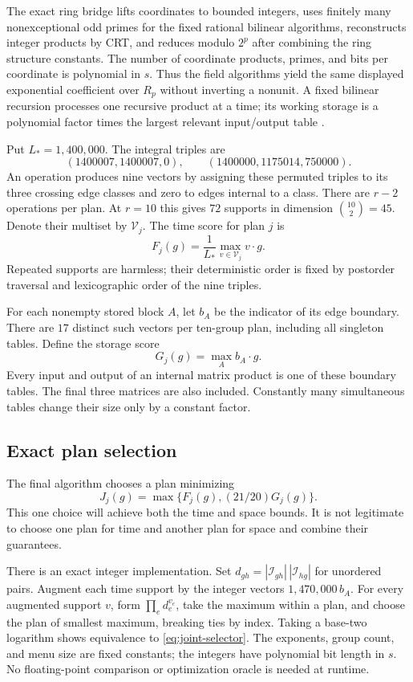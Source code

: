 The exact ring bridge lifts coordinates to bounded integers, uses finitely
many nonexceptional odd primes for the fixed rational bilinear algorithms,
reconstructs integer products by CRT, and reduces modulo $2^p$ after
combining the ring structure constants. The number of coordinate products,
primes, and bits per coordinate is polynomial in $s$. Thus the field
algorithms yield the same displayed exponential coefficient over $R_p$
without inverting a nonunit. A fixed bilinear recursion processes one
recursive product at a time; its working storage is a polynomial factor
times the largest relevant input/output table \cite{rectangular}.

Put $L_*=1{,}400{,}000$. The integral triples are
\begin{equation}\label{eq:triples}
 (1400007,1400007,0),\qquad(1400000,1175014,750000).
\end{equation}
An operation produces nine vectors by assigning these permuted triples to
its three crossing edge classes and zero to edges internal to a class.
There are $r-2$ operations per plan. At $r=10$ this gives $72$ supports
in dimension $\binom{10}2=45$. Denote their multiset by $\mathcal V_j$.
The time score for plan $j$ is
\[
 F_j(g)=\frac1{L_*}\max_{v\in\mathcal V_j}v\cdot g.
\]
Repeated supports are harmless; their deterministic order is fixed by
postorder traversal and lexicographic order of the nine triples.

For each nonempty stored block $A$, let $b_A$ be the indicator of its
edge boundary. There are $17$ distinct such vectors per ten-group plan,
including all singleton tables. Define the storage score
\begin{equation}\label{eq:space-score}
 G_j(g)=\max_A b_A\cdot g.
\end{equation}
Every input and output of an internal matrix product is one of these
boundary tables. The final three matrices are also included. Constantly
many simultaneous tables change their size only by a constant factor.

\subsection{Exact plan selection}

The final algorithm chooses a plan minimizing
\begin{equation}\label{eq:joint-selector}
 J_j(g)=\max\{F_j(g),(21/20)G_j(g)\}.
\end{equation}
This one choice will achieve both the time and space bounds. It is not
legitimate to choose one plan for time and another plan for space and
combine their guarantees.

There is an exact integer implementation. Set
$d_{gh}=|\mathcal I_{gh}|\,|\mathcal I_{hg}|$ for unordered pairs.
Augment each time support by the integer vectors $1{,}470{,}000\,b_A$.
For every augmented support $v$, form $\prod_e d_e^{v_e}$, take the maximum
within a plan, and choose the plan of smallest maximum, breaking ties by
index. Taking a base-two logarithm shows equivalence to
\eqref{eq:joint-selector}. The exponents, group count, and menu size are
fixed constants; the integers have polynomial bit length in $s$.
No floating-point comparison or optimization oracle is needed at runtime.
